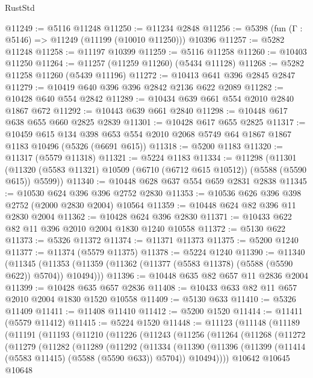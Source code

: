 \begin{lexlean}{RustStd}
\begin{coremodule}
@11249 := @5116 @11248
@11250 := @11234 @2848
@11256 := @5398 (fun (Γ : @5146) => @11249 (@11199 (@10010 @11250))) @10396
@11257 := @5282 @11248
@11258 := @11197 @10399
@11259 := @5116 @11258
@11260 := @10403 @11250
@11264 := @11257 (@11259 @11260) (@5434 @11128)
@11268 := @5282 @11258 @11260 (@5439 @11196)
@11272 := @10413 @641 @396 @2845 @2847
@11279 := @10419 @640 @396 @396 @2842 @2136 @622 @2089
@11282 := @10428 @640 @554 @2842
@11289 := @10434 @639 @661 @554 @2010 @2840 @1867 @672
@11292 := @10443 @639 @661 @2840
@11298 := @10448 @617 @638 @655 @660 @2825 @2839
@11301 := @10428 @617 @655 @2825
@11317 := @10459
    @615
    @134
    @398
    @653
    @554
    @2010
    @2068
    @5749
    @64
    @1867
    @1867
    @1183
    @10496
    (@5326 (@6691 @615))
@11318 := @5200 @1183
@11320 := @11317 (@5579 @11318)
@11321 := @5224 @1183
@11334 := @11298
    (@11301 (@11320 (@5583 @11321) @10509 (@6710 (@6712 @615 @10512)) (@5588 (@5590 @615)) @5599))
@11340 := @10448 @628 @637 @554 @659 @2831 @2838
@11345 := @10530 @624 @396 @396 @2752 @2830
@11353 := @10536 @626 @396 @398 @2752 (@2000 @2830 @2004) @10564
@11359 := @10448 @624 @82 @396 @11 @2830 @2004
@11362 := @10428 @624 @396 @2830
@11371 := @10433 @622 @82 @11 @396 @2010 @2004 @1830 @1240 @10558
@11372 := @5130 @622
@11373 := @5326 @11372
@11374 := @11371 @11373
@11375 := @5200 @1240
@11377 := @11374 (@5579 @11375)
@11378 := @5224 @1240
@11390 := @11340
    (@11345 (@11353 (@11359 (@11362 (@11377 (@5583 @11378) (@5588 (@5590 @622)) @5704)) @10494)))
@11396 := @10448 @635 @82 @657 @11 @2836 @2004
@11399 := @10428 @635 @657 @2836
@11408 := @10433 @633 @82 @11 @657 @2010 @2004 @1830 @1520 @10558
@11409 := @5130 @633
@11410 := @5326 @11409
@11411 := @11408 @11410
@11412 := @5200 @1520
@11414 := @11411 (@5579 @11412)
@11415 := @5224 @1520
@11448 := @11123
    (@11148
      (@11189
        (@11191
          (@11193
            (@11210
              (@11226
                (@11243
                  (@11256
                    (@11264
                      (@11268
                        (@11272
                          (@11279
                            (@11282
                              (@11289
                                (@11292
                                  (@11334
                                    (@11390
                                      (@11396
                                        (@11399 (@11414 (@5583 @11415) (@5588 (@5590 @633)) @5704))
                                        @10494))))
                                @10642
                                @10645
                                @10648

\end{coremodule}
\end{lexlean}
